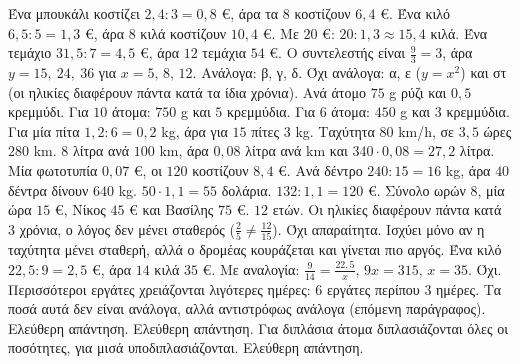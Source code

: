  Ένα μπουκάλι κοστίζει $2{,}4:3=0{,}8$ €, άρα τα $8$ κοστίζουν $6{,}4$ €.
 Ένα κιλό $6{,}5:5=1{,}3$ €, άρα $8$ κιλά κοστίζουν $10{,}4$ €. Με $20$ €: $20:1{,}3\approx15{,}4$ κιλά.
 Ένα τεμάχιο $31{,}5:7=4{,}5$ €, άρα $12$ τεμάχια $54$ €.
 Ο συντελεστής είναι $\frac{9}{3}=3$, άρα $y=15,\ 24,\ 36$ για $x=5,\,8,\,12$.
 Ανάλογα: β, γ, δ. Όχι ανάλογα: α, ε ($y=x^2$) και στ (οι ηλικίες διαφέρουν πάντα κατά τα ίδια χρόνια).
 Ανά άτομο $75$ g ρύζι και $0{,}5$ κρεμμύδι. Για $10$ άτομα: $750$ g και $5$ κρεμμύδια. Για $6$ άτομα: $450$ g και $3$ κρεμμύδια.
 Για μία πίτα $1{,}2:6=0{,}2$ kg, άρα για $15$ πίτες $3$ kg.
 Ταχύτητα $80$ km/h, σε $3{,}5$ ώρες $280$ km.
 $8$ λίτρα ανά $100$ km, άρα $0{,}08$ λίτρα ανά km και $340\cdot0{,}08=27{,}2$ λίτρα.
 Μία φωτοτυπία $0{,}07$ €, οι $120$ κοστίζουν $8{,}4$ €.
 Ανά δέντρο $240:15=16$ kg, άρα $40$ δέντρα δίνουν $640$ kg.
 $50\cdot1{,}1=55$ δολάρια. $132:1{,}1=120$ €.
 Σύνολο ωρών $8$, μία ώρα $15$ €, Νίκος $45$ € και Βασίλης $75$ €.
 $12$ ετών. Οι ηλικίες διαφέρουν πάντα κατά $3$ χρόνια, ο λόγος δεν μένει σταθερός ($\frac{2}{5}\neq\frac{12}{15}$).
 Όχι απαραίτητα. Ισχύει μόνο αν η ταχύτητα μένει σταθερή, αλλά ο δρομέας κουράζεται και γίνεται πιο αργός.
 Ένα κιλό $22{,}5:9=2{,}5$ €, άρα $14$ κιλά $35$ €. Με αναλογία: $\frac{9}{14}=\frac{22{,}5}{x}$, $9x=315$, $x=35$.
 Όχι. Περισσότεροι εργάτες χρειάζονται λιγότερες ημέρες: $6$ εργάτες περίπου $3$ ημέρες. Τα ποσά αυτά δεν είναι ανάλογα, αλλά αντιστρόφως ανάλογα (επόμενη παράγραφος).
 Ελεύθερη απάντηση.
 Ελεύθερη απάντηση. Για διπλάσια άτομα διπλασιάζονται όλες οι ποσότητες, για μισά υποδιπλασιάζονται.
 Ελεύθερη απάντηση.
